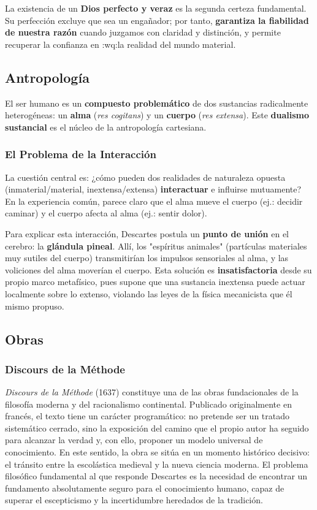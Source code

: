\documentclass[10pt]{article}
\begin{document}
La existencia de un \textbf{Dios perfecto y veraz} es la segunda certeza fundamental. Su perfección excluye que sea un engañador; por tanto,
\textbf{garantiza la fiabilidad de nuestra razón} cuando juzgamos con claridad y distinción, y permite recuperar la confianza en :wq:la realidad del mundo material.

\subsection{Antropología}

El ser humano es un \textbf{compuesto problemático} de dos sustancias radicalmente heterogéneas: un \textbf{alma} (\textit{res cogitans}) y un \textbf{cuerpo} (\textit{res extensa}). Este \textbf{dualismo sustancial} es el núcleo de la antropología cartesiana.

\subsubsection{El Problema de la Interacción}

La cuestión central es: ¿cómo pueden dos realidades de naturaleza opuesta (inmaterial/material, inextensa/extensa) \textbf{interactuar} e influirse mutuamente? 
En la experiencia común, parece claro que el alma mueve el cuerpo (ej.: decidir caminar) y el cuerpo afecta al alma (ej.: sentir dolor).

Para explicar esta interacción, Descartes postula un \textbf{punto de unión} en el cerebro: la \textbf{glándula pineal}. Allí, los "espíritus animales" (partículas materiales
muy sutiles del cuerpo) transmitirían los impulsos sensoriales al alma, y las voliciones del alma moverían el cuerpo. Esta solución es \textbf{insatisfactoria} desde su propio
marco metafísico, pues supone que una sustancia inextensa puede actuar localmente sobre lo extenso, violando las leyes de la física mecanicista que él mismo propuso.

\subsection{Obras}

\subsubsection{Discours de la Méthode}

\textit{Discours de la Méthode} (1637) constituye una de las obras fundacionales de la filosofía moderna y del racionalismo continental. Publicado originalmente en francés, el texto tiene un carácter 
programático: no pretende ser un tratado sistemático cerrado, sino la exposición del camino que el propio autor ha seguido para alcanzar la verdad y, con ello, proponer un modelo universal de conocimiento.
En este sentido, la obra se sitúa en un momento histórico decisivo: el tránsito entre la escolástica medieval y la nueva ciencia moderna. El problema filosófico fundamental al que responde Descartes es la
necesidad de encontrar un fundamento absolutamente seguro para el conocimiento humano, capaz de superar el escepticismo y la incertidumbre heredados de la tradición.
\end{document}
